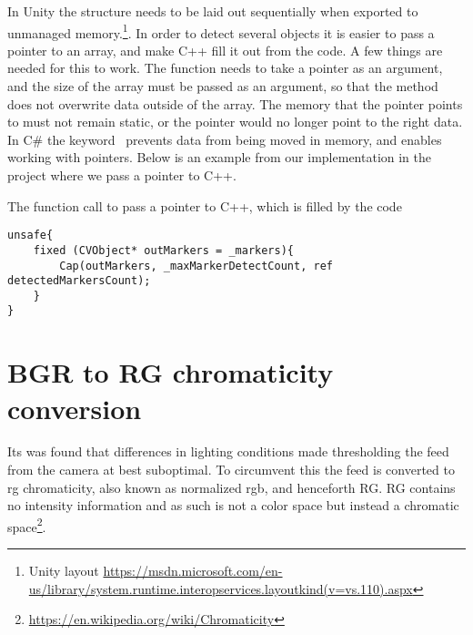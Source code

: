In Unity the structure needs to be laid out sequentially when exported to unmanaged memory.\footnote{Unity layout \url{https://msdn.microsoft.com/en-us/library/system.runtime.interopservices.layoutkind(v=vs.110).aspx}}. In order to detect several objects it is easier to pass a pointer to an array, and make C++ fill it out from the code. A few things are needed for this to work. The function needs to take a pointer as an argument, and the size of the array must be passed as an argument, so that the method does not overwrite data outside of the array. The memory that the pointer points to must not remain static, or the pointer would no longer point to the right data. In C\# the keyword  prevents data from being moved in memory, and  enables working with pointers. Below is an example from our implementation in the project where we pass a pointer to C++. %
\begin{listing}[H]
\caption{The function call to pass a pointer to C++, which is filled by the code}
\label{listing:pointer}
\begin{verbatim}
unsafe{
	fixed (CVObject* outMarkers = _markers){
		Cap(outMarkers, _maxMarkerDetectCount, ref detectedMarkersCount);
	}
}
\end{verbatim}
\end{listing}

\section{BGR to RG chromaticity conversion}
Its was found that differences in lighting conditions made thresholding the feed from the camera at best suboptimal. To circumvent this the feed is converted to rg chromaticity, also known as normalized rgb, and henceforth RG. RG contains no intensity information and as such is not a color space but instead a chromatic space\footnote{\url{https://en.wikipedia.org/wiki/Chromaticity}}.
